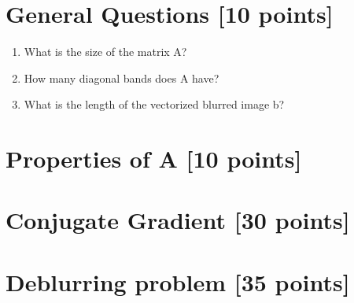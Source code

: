 \documentclass[unicode,11pt,a4paper,oneside,numbers=endperiod,openany]{scrartcl}
\begin{document}
\setassignment
{}

\newline


\section{General Questions [10 points]}
\begin{enumerate}
    \item What is the size of the matrix A?
    \item How many diagonal bands does A have?
    \item What is the length of the vectorized blurred image b?

\end{enumerate}

\section{Properties of A [10 points]}

\section{Conjugate Gradient [30 points]}

\section{Deblurring problem [35 points]}
\end{document}
